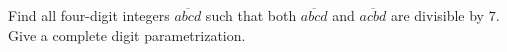 Find all four-digit integers $\overline{abcd}$ such that both $\overline{abcd}$ and $\overline{acbd}$ are divisible by $7$. Give a complete digit parametrization.
